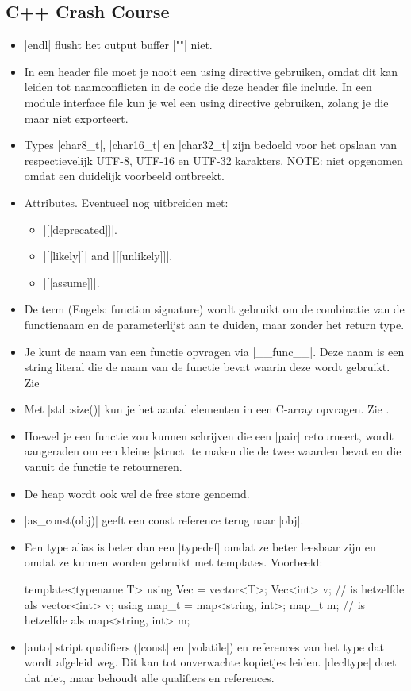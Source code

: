 \begin{cpplstShortInline}
\subsection{C++ Crash Course}
\begin{itemize}
	\item
	|endl| flusht het output buffer |"\n"| niet.
	\item
	In een header file moet je nooit een using directive gebruiken, omdat dit kan leiden tot naamconflicten in de code die deze header file include.
	In een module interface file kun je wel een using directive gebruiken, zolang je die maar niet exporteert.
	\item
	Types |char8_t|, |char16_t| en |char32_t| zijn bedoeld voor het opslaan van respectievelijk UTF-8, UTF-16 en UTF-32 karakters.
	NOTE: niet opgenomen omdat een duidelijk voorbeeld ontbreekt.
	\item
	Attributes.
	Eventueel nog uitbreiden met:
	\begin{itemize}
		\item |[[deprecated]]|.
		\item |[[likely]]| and |[[unlikely]]|.
		\item |[[assume]]|.
	\end{itemize}
	\item
	De term  (Engels: function signature) wordt gebruikt om de combinatie van de functienaam en de parameterlijst aan te duiden, maar zonder het return type.
	\item
	Je kunt de naam van een functie opvragen via |__func__|. 
	Deze naam is een string literal die de naam van de functie bevat waarin deze wordt gebruikt.
	Zie 
	\item
	Met |std::size()| kun je het aantal elementen in een C-array opvragen.
	Zie .
	\item
	Hoewel je een functie zou kunnen schrijven die een |pair| retourneert, wordt aangeraden om een kleine |struct| te maken die de twee waarden bevat en die vanuit de functie te retourneren.
	\item
	De heap wordt ook wel de free store genoemd.
	\item
	|as_const(obj)| geeft een const reference terug naar |obj|.
	\item
	Een type alias is beter dan een |typedef| omdat ze beter leesbaar zijn en omdat ze kunnen worden gebruikt met templates.
	Voorbeeld:
\begin{cpplstfragment}
	template<typename T>
	using Vec = vector<T>;
	Vec<int> v; // is hetzelfde als vector<int> v;
	using map_t = map<string, int>;
	map_t m; // is hetzelfde als map<string, int> m;
\end{cpplstfragment}
	\item
	|auto| stript qualifiers (|const| en |volatile|) en references van het type dat wordt afgeleid weg.
	Dit kan tot onverwachte kopietjes leiden.
	|decltype| doet dat niet, maar behoudt alle qualifiers en references.
\end{itemize}

\end{cpplstShortInline}
